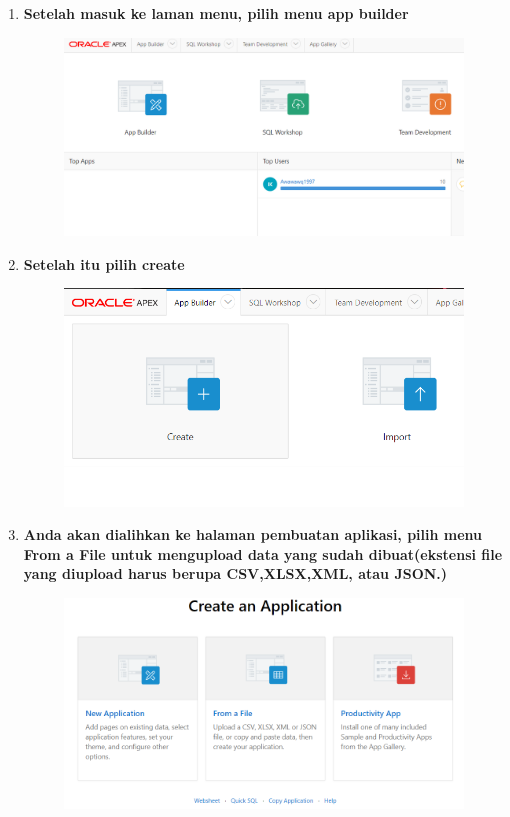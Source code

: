\begin{enumerate}
\item \textbf{Setelah masuk ke laman menu, pilih menu app builder}\begin{figure}[H]
    \centering
    \includegraphics[scale=0.3]{figures/9.png}
    \label{9}
\end{figure}


\item \textbf{Setelah itu pilih create}\begin{figure}[H]
    \centering
    \includegraphics[scale=0.3]{figures/10.png}
    \label{10}
\end{figure}


\item \textbf{Anda akan dialihkan ke halaman pembuatan aplikasi, pilih menu From a File untuk mengupload data yang sudah dibuat(ekstensi file yang diupload harus berupa CSV,XLSX,XML, atau JSON.)}
\begin{figure}[H]
    \centering
    \includegraphics[scale=0.3]{figures/11.png}
    \label{11}
\end{figure}



\end{enumerate}
